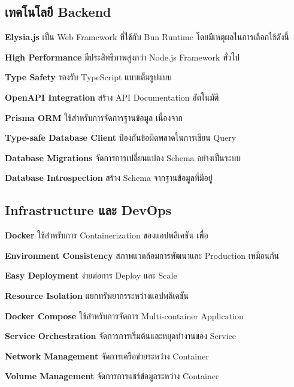 \subsection{เทคโนโลยี Backend}

\hspace*{1.5em} %
\textbf{Elysia.js} เป็น Web Framework ที่ใช้กับ Bun Runtime โดยมีเหตุผลในการเลือกใช้ดังนี้
\begin{mycustomitem}
    \item \textbf{High Performance} มีประสิทธิภาพสูงกว่า Node.js Framework ทั่วไป
    \item \textbf{Type Safety} รองรับ TypeScript แบบเต็มรูปแบบ
    \item \textbf{OpenAPI Integration} สร้าง API Documentation อัตโนมัติ
\end{mycustomitem}

\hspace*{1.5em} %
\textbf{Prisma ORM} ใช้สำหรับการจัดการฐานข้อมูล เนื่องจาก
\begin{mycustomitem}
    \item \textbf{Type-safe Database Client} ป้องกันข้อผิดพลาดในการเขียน Query
    \item \textbf{Database Migrations} จัดการการเปลี่ยนแปลง Schema อย่างเป็นระบบ
    \item \textbf{Database Introspection} สร้าง Schema จากฐานข้อมูลที่มีอยู่
\end{mycustomitem}

\subsection{Infrastructure และ DevOps}

\hspace*{1.5em} %
\textbf{Docker} ใช้สำหรับการ Containerization ของแอปพลิเคชัน เพื่อ
\begin{mycustomitem}
    \item \textbf{Environment Consistency} สภาพแวดล้อมการพัฒนาและ Production เหมือนกัน
    \item \textbf{Easy Deployment} ง่ายต่อการ Deploy และ Scale
    \item \textbf{Resource Isolation} แยกทรัพยากรระหว่างแอปพลิเคชัน
\end{mycustomitem}

\hspace*{1.5em} %
\textbf{Docker Compose} ใช้สำหรับการจัดการ Multi-container Application
\begin{mycustomitem}
    \item \textbf{Service Orchestration} จัดการการเริ่มต้นและหยุดทำงานของ Service
    \item \textbf{Network Management} จัดการเครือข่ายระหว่าง Container
    \item \textbf{Volume Management} จัดการการแชร์ข้อมูลระหว่าง Container
\end{mycustomitem}

